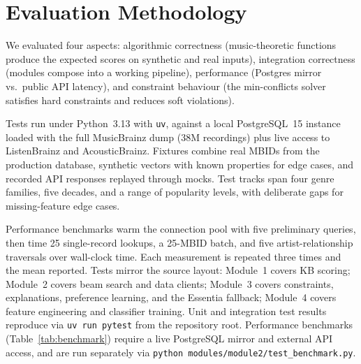 \section{Evaluation Methodology}

We evaluated four aspects: algorithmic correctness (music-theoretic functions produce the expected scores on synthetic and real inputs), integration correctness (modules compose into a working pipeline), performance (Postgres mirror vs.\ public API latency), and constraint behaviour (the min-conflicts solver satisfies hard constraints and reduces soft violations).

Tests run under Python~3.13 with \texttt{uv}, against a local PostgreSQL~15 instance loaded with the full MusicBrainz dump (38M recordings) plus live access to ListenBrainz and AcousticBrainz. Fixtures combine real MBIDs from the production database, synthetic vectors with known properties for edge cases, and recorded API responses replayed through mocks. Test tracks span four genre families, five decades, and a range of popularity levels, with deliberate gaps for missing-feature edge cases.

Performance benchmarks warm the connection pool with five preliminary queries, then time 25 single-record lookups, a 25-MBID batch, and five artist-relationship traversals over wall-clock time. Each measurement is repeated three times and the mean reported. Tests mirror the source layout: Module~1 covers KB scoring; Module~2 covers beam search and data clients; Module~3 covers constraints, explanations, preference learning, and the Essentia fallback; Module~4 covers feature engineering and classifier training. Unit and integration test results reproduce via \texttt{uv run pytest} from the repository root. Performance benchmarks (Table~\ref{tab:benchmark}) require a live PostgreSQL mirror and external API access, and are run separately via \texttt{python modules/module2/test\_benchmark.py}.
